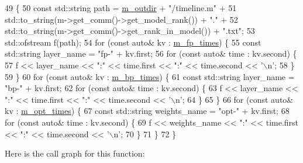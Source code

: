 \begin{DoxyCode}
49                                                    \{
50   \textcolor{keyword}{const} std::string path = \hyperlink{classlbann_1_1lbann__callback__timeline_afb064216a569f0763b2fff4ab5547790}{m\_outdir} + \textcolor{stringliteral}{"/timeline.m"} +
51     std::to\_string(m->get\_comm()->get\_model\_rank()) + \textcolor{stringliteral}{"."} +
52     std::to\_string(m->get\_comm()->get\_rank\_in\_model()) + \textcolor{stringliteral}{".txt"};
53   std::ofstream f(path);
54   \textcolor{keywordflow}{for} (\textcolor{keyword}{const} \textcolor{keyword}{auto}& kv : \hyperlink{classlbann_1_1lbann__callback__timeline_ab43061b16cd5d29045be1d9294a80ef1}{m\_fp\_times}) \{
55     \textcolor{keyword}{const} std::string layer\_name = \textcolor{stringliteral}{"fp-"} + kv.first;
56     \textcolor{keywordflow}{for} (\textcolor{keyword}{const} \textcolor{keyword}{auto}& time : kv.second) \{
57       f << layer\_name << \textcolor{stringliteral}{":"} << time.first << \textcolor{stringliteral}{":"} << time.second << \textcolor{charliteral}{'\(\backslash\)n'};
58     \}
59   \}
60   \textcolor{keywordflow}{for} (\textcolor{keyword}{const} \textcolor{keyword}{auto}& kv : \hyperlink{classlbann_1_1lbann__callback__timeline_a59e63a11f33ed0cf3fd40dd2d8f91ede}{m\_bp\_times}) \{
61     \textcolor{keyword}{const} std::string layer\_name = \textcolor{stringliteral}{"bp-"} + kv.first;
62     \textcolor{keywordflow}{for} (\textcolor{keyword}{const} \textcolor{keyword}{auto}& time : kv.second) \{
63       f << layer\_name << \textcolor{stringliteral}{":"} << time.first << \textcolor{stringliteral}{":"} << time.second << \textcolor{charliteral}{'\(\backslash\)n'};
64     \}
65   \}
66   \textcolor{keywordflow}{for} (\textcolor{keyword}{const} \textcolor{keyword}{auto}& kv : \hyperlink{classlbann_1_1lbann__callback__timeline_abc57215e52823fe6f44f040f06f60847}{m\_opt\_times}) \{
67     \textcolor{keyword}{const} std::string weights\_name = \textcolor{stringliteral}{"opt-"} + kv.first;
68     \textcolor{keywordflow}{for} (\textcolor{keyword}{const} \textcolor{keyword}{auto}& time : kv.second) \{
69       f << weights\_name << \textcolor{stringliteral}{":"} << time.first << \textcolor{stringliteral}{":"} << time.second << \textcolor{charliteral}{'\(\backslash\)n'};
70     \}
71   \}
72 \}
\end{DoxyCode}
Here is the call graph for this function\+:\nopagebreak
